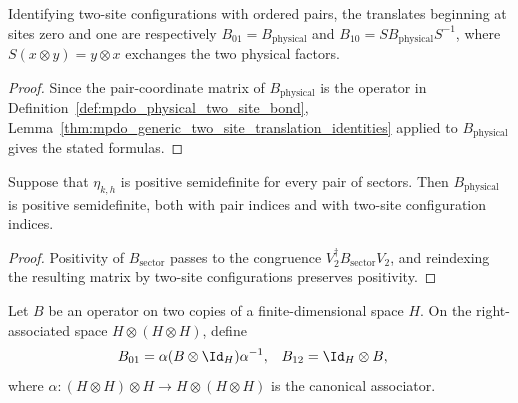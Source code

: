 \begin{lemma}
    \label{thm:mpdo_physical_two_site_translation_identities}
    \leanok
    Identifying two-site configurations with ordered
    pairs, the translates beginning at sites zero and one are respectively
    $B_{01}=B_{\mathrm{physical}}$ and
    $B_{10}=S B_{\mathrm{physical}}S^{-1}$, where
    $S(x\otimes y)=y\otimes x$ exchanges the two physical factors.
\end{lemma}

\begin{proof}
    \leanok
    Since the pair-coordinate matrix of $B_{\mathrm{physical}}$ is the operator
    in Definition~\ref{def:mpdo_physical_two_site_bond},
    Lemma~\ref{thm:mpdo_generic_two_site_translation_identities} applied to
    $B_{\mathrm{physical}}$ gives the stated formulas.
\end{proof}

\begin{lemma}
    \label{thm:mpdo_physical_two_site_bond_pos}
    \leanok
    Suppose that $\eta_{k,h}$ is positive semidefinite for every pair of
    sectors. Then $B_{\mathrm{physical}}$ is positive semidefinite, both with
    pair indices and with two-site configuration indices.
\end{lemma}

\begin{proof}
    \leanok
    Positivity of $B_{\mathrm{sector}}$ passes to the congruence
    $V_2^\dagger B_{\mathrm{sector}}V_2$, and reindexing the resulting matrix
    by two-site configurations preserves positivity.
\end{proof}

\begin{definition}
    \label{def:mpdo_three_site_pair_lifts}
    \leanok
    Let $B$ be an operator on two copies of a finite-dimensional space $H$.
    On the right-associated space $H\otimes(H\otimes H)$, define
    \begin{align}
        B_{01}
         & =\alpha(B\otimes\Id_H)\alpha^{-1},
         &
        B_{12}
         & =\Id_H\otimes B,
        \notag
    \end{align}
    where $\alpha:(H\otimes H)\otimes H\to H\otimes(H\otimes H)$ is the
    canonical associator.
\end{definition}

